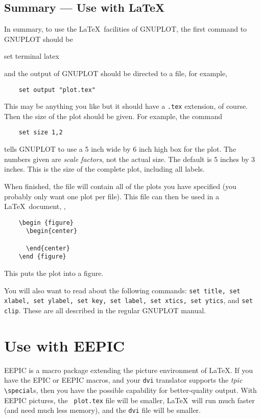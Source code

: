 
\subsection{Summary --- Use with \LaTeX}
In summary, to use the \LaTeX\ facilities of GNUPLOT, the first
command to GNUPLOT should be
\begin{syntax}
    set terminal latex
\end{syntax}
and the output of GNUPLOT should be directed to a file, for example,
\begin{verbatim}
    set output "plot.tex"
\end{verbatim}
This may be anything you like but it should have a {\tt .tex} extension,
of course. Then the size of the plot should be given. For example, the
command 
\begin{verbatim}
    set size 1,2
\end{verbatim}
tells GNUPLOT to use a 5 inch wide by 6 inch high box for the plot.
The numbers given are {\em scale factors}, not the actual size.  The
default is 5 inches by 3 inches.  This is the size of the complete
plot, including all labels.

When finished, the file will contain all of the plots you have
specified (you probably only want one plot per file). This file can
then be used in a \LaTeX\ document, \eg,

\singlespace
\begin{verbatim}
    \begin {figure}
      \begin{center}
        
      \end{center}
    \end {figure}
\end{verbatim}
\currentspace
This puts the plot into a figure. 

You will also want to read about the following commands: {\tt set
title, set xlabel, set ylabel, set key, set label, set xtics, set
ytics}, and {\tt set clip}.  These are all described in the regular
GNUPLOT manual.

\section{Use with EEPIC}
\label{s:eepic}
EEPIC is a macro package extending the picture environment of \LaTeX.
If you have the EPIC or EEPIC macros, and your {\tt dvi} translator
supports the {\em tpic\/} \verb+\special+s, then you have the possible
capability for better-quality output. With EEPIC pictures, the {\tt
plot.tex} file will be smaller, \LaTeX\ will run much faster (and need
much less memory), and the {\tt dvi} file will be smaller.

